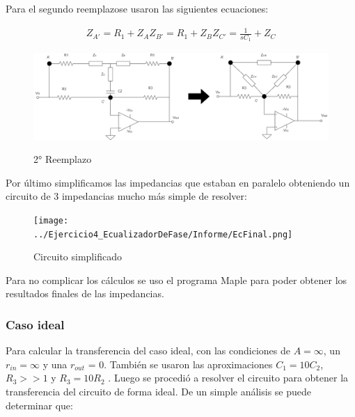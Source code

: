 Para el segundo reemplazose usaron las siguientes ecuaciones:

\begin{align}
	\begin{equation}
		Z_{A'}= R_1 + Z_{A}
	\end{equation}
	\begin{equation}
		Z_{B'}= R_1 + Z_{B}
	\end{equation}
	
	\begin{equation}
		Z_{C'}= \frac{1}{sC_1} + Z_{C}
	\end{equation}
\end{align}

\begin{figure}[h]
	\caption{2° Reemplazo}
	\centering
	\includegraphics[scale=0.6]{../Ejercicio4-EcualizadorDeFase/Informe/2cambioTriangulo.png}
	\label{2reemplazo} 
\end{figure}

Por último simplificamos las impedancias que estaban en paralelo obteniendo un circuito de 3 impedancias mucho más simple de resolver:

\begin{figure}
	\centering
	\texttt{[image: ../Ejercicio4\_EcualizadorDeFase/Informe/EcFinal.png]}
	\caption{Circuito simplificado}
	\label{Cir Final}
\end{figure}

Para no complicar los cálculos se uso el programa Maple para poder obtener los resultados finales de las impedancias.


\subsubsection{Caso ideal}

Para calcular la transferencia del caso ideal, con las condiciones de $A=\infty $, un $r_{in}=\infty$ y una $r_{out}$ = 0. También se usaron las aproximaciones $C_1 = 10 C_2$, $R_3 >> 1 $ y $R_3 = 10 R_2$ . Luego se procedió a resolver el circuito para obtener la transferencia del circuito de forma ideal. De un simple análisis se puede determinar que:

